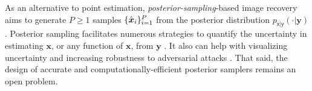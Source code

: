 \documentclass{article}
\theoremstyle{plain}
\theoremstyle{definition}
\theoremstyle{remark}
\newcommand{\defn}{\triangleq}
\newcommand{\hvec}[1]{\ensuremath{\Hat{\boldsymbol{#1}}}}
\renewcommand{\vec}[1]{\ensuremath{\boldsymbol{#1}}}
\newcommand{\avgP}{_{\scriptscriptstyle (P)}}
\newcommand{\pxgy}{p_{\mathsf{x}|\mathsf{y}}}
\begin{document}
As an alternative to point estimation, \emph{posterior-sampling}-based image recovery \cite{Ardizzone:19,Winkler:19,Sun:AAAI:21,Wen:ICML:23,Edupuganti:TMI:20,Tonolini:JMLR:20,Sohn:NIPS:15,Isola:CVPR:17,Adler:18,Zhao:ICLR:21,Zhao:MIA:18,Bendel:NIPS:23,Welling:ICML:11,Song:NIPS:20,Jalal:NIPS:21,Song:ICLR:21,Song:ICLR:22,Kawar:NIPS:22,Chung:ICLR:23,Wang:ICLR:23} aims to generate $P\geq 1$ samples $\{\hvec{x}_i\}_{i=1}^P$ from the posterior distribution $\pxgy(\cdot|\vec{y})$.
Posterior sampling facilitates numerous strategies to quantify the uncertainty in estimating $\vec{x}$, or any function of $\vec{x}$, from $\vec{y}$ \cite{Abdar:IF:21,Lambert:AIMed:24}.
It also can help with visualizing uncertainty and increasing robustness to adversarial attacks \cite{Ohayon:ICML:23}.
That said, the design of accurate and computationally-efficient posterior samplers remains an open problem.

\end{document}
